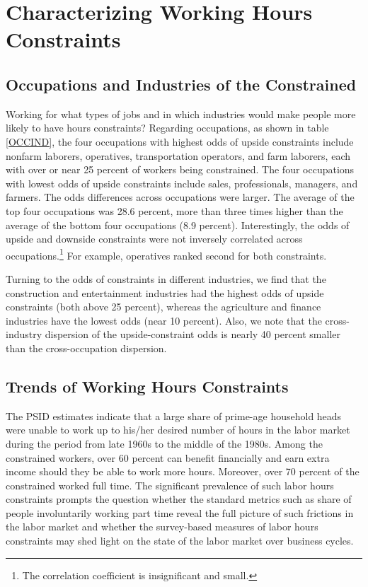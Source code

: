 \section{Characterizing Working Hours Constraints}

\subsection{Occupations and Industries of the Constrained}
Working for what types of jobs and in which industries would make people more likely to have hours constraints?  Regarding occupations, as shown in table \ref{OCCIND}, the four occupations with highest odds of upside constraints include nonfarm laborers, operatives, transportation operators, and farm laborers, each with over or near 25 percent of workers being constrained.  The four occupations with lowest odds of upside constraints include sales, professionals, managers, and farmers.  The odds differences across occupations were larger. The average of the top four occupations was 28.6 percent, more than three times higher than the average of the bottom four occupations (8.9 percent).  Interestingly, the odds of upside and downside constraints were not inversely correlated across occupations.\footnote{The correlation coefficient is insignificant and small.}  For example, operatives ranked second for both constraints.

Turning to the odds of constraints in different industries, we find that the construction and entertainment industries had the highest odds of upside constraints (both above 25 percent), whereas the agriculture and finance industries have the lowest odds (near 10 percent).  Also, we note that the cross-industry dispersion of the upside-constraint odds is nearly 40 percent smaller than the cross-occupation dispersion.

\subsection{Trends of Working Hours Constraints}

The PSID estimates indicate that a large share of prime-age household heads were unable to work up to his/her desired number of hours in the labor market during the period from late 1960s to the middle of the 1980s. Among the constrained workers, over 60 percent can benefit financially and earn extra income should they be able to work more hours. Moreover, over 70 percent of the constrained worked full time. The significant prevalence of such labor hours constraints prompts the question whether the standard metrics such as share of people involuntarily working part time reveal the full picture of such frictions in the labor market and whether the survey-based measures of labor hours constraints may shed light on the state of the labor market over business cycles.


